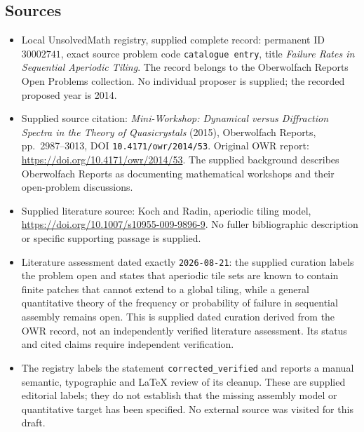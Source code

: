 \documentclass[11pt]{article}
\begin{document}
\subsection{Sources}
\begin{itemize}
\item Local UnsolvedMath registry, supplied complete record: permanent ID \(30002741\), exact source problem code \texttt{catalogue entry}, title \emph{Failure Rates in Sequential Aperiodic Tiling}. The record belongs to the Oberwolfach Reports Open Problems collection. No individual proposer is supplied; the recorded proposed year is 2014.
\item Supplied source citation: \emph{Mini-Workshop: Dynamical versus Diffraction Spectra in the Theory of Quasicrystals} (2015), Oberwolfach Reports, pp.\ 2987--3013, DOI \texttt{10.4171/owr/2014/53}. Original OWR report: \url{https://doi.org/10.4171/owr/2014/53}. The supplied background describes Oberwolfach Reports as documenting mathematical workshops and their open-problem discussions.
\item Supplied literature source: Koch and Radin, aperiodic tiling model, \url{https://doi.org/10.1007/s10955-009-9896-9}. No fuller bibliographic description or specific supporting passage is supplied.
\item Literature assessment dated exactly \texttt{2026-08-21}: the supplied curation labels the problem open and states that aperiodic tile sets are known to contain finite patches that cannot extend to a global tiling, while a general quantitative theory of the frequency or probability of failure in sequential assembly remains open. This is supplied dated curation derived from the OWR record, not an independently verified literature assessment. Its status and cited claims require independent verification.
\item The registry labels the statement \texttt{corrected\_verified} and reports a manual semantic, typographic and LaTeX review of its cleanup. These are supplied editorial labels; they do not establish that the missing assembly model or quantitative target has been specified. No external source was visited for this draft.
\end{itemize}
\end{document}
